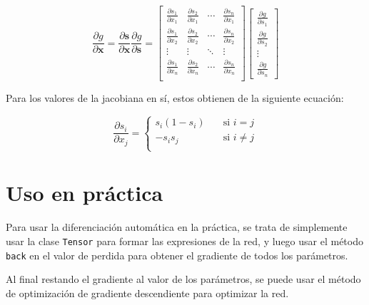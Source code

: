 \documentclass{article}
\begin{document}
\renewcommand{\arraystretch}{1.8}

\def\one{1}

\begin{equation*}
	\frac{\partial g}{\partial \bm{x}} = 
	\frac{\partial \bm{s}}{\partial \bm{x}} \frac{\partial g}{\partial \bm{s}} =
	\begin{bmatrix}
		\frac{\partial s_1}{\partial x_1} & \frac{\partial s_2}{\partial x_1} & \cdots & \frac{\partial s_n}{\partial x_1} \\
		\frac{\partial s_1}{\partial x_2} & \frac{\partial s_2}{\partial x_2} & \cdots & \frac{\partial s_n}{\partial x_2} \\
		\vdots & \vdots & \ddots & \vdots \\
		\frac{\partial s_1}{\partial x_n} & \frac{\partial s_2}{\partial x_n} & \cdots & \frac{\partial s_n}{\partial x_n} \\
		
	\end{bmatrix}
	\begin{bmatrix}
		\frac{\partial g}{\partial s_1} \\
		\frac{\partial g}{\partial s_2} \\
		\vdots \\
		\frac{\partial g}{\partial s_n}
	\end{bmatrix}
\end{equation*}

Para los valores de la jacobiana en sí, estos obtienen de la siguiente ecuación:

\begin{equation*}
	\frac{\partial s_i}{\partial x_j} = \begin{cases}
		s_i (1 - s_i) \quad &\text{si } i = j \\
		- s_i s_j \quad &\text{si } i \neq j \\
	\end{cases}
\end{equation*}

\section{Uso en práctica}

Para usar la diferenciación automática en la práctica, se trata de simplemente usar la clase \texttt{Tensor} para formar las
expresiones de la red, y luego usar el método \texttt{back} en el valor de perdida para obtener el gradiente de todos los parámetros.

Al final restando el gradiente al valor de los parámetros, se puede usar el método de optimización de gradiente descendiente para optimizar la red.
\end{document}
